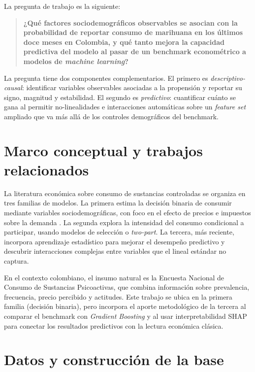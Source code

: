 \documentclass[12pt, a4paper]{article}
\begin{document}
La pregunta de trabajo es la siguiente:

\begin{quote}
\textbf{¿Qué factores sociodemográficos observables se asocian con la probabilidad de reportar consumo de marihuana en los últimos doce meses en Colombia, y qué tanto mejora la capacidad predictiva del modelo al pasar de un benchmark econométrico a modelos de \textit{machine learning}?}
\end{quote}

La pregunta tiene dos componentes complementarios. El primero es \textit{descriptivo-causal}: identificar variables observables asociadas a la propensión y reportar su signo, magnitud y estabilidad. El segundo es \textit{predictivo}: cuantificar cuánto se gana al permitir no-linealidades e interacciones automáticas sobre un \textit{feature set} ampliado que va más allá de los controles demográficos del benchmark.

\section{Marco conceptual y trabajos relacionados}

La literatura económica sobre consumo de sustancias controladas se organiza en tres familias de modelos. La primera estima la decisión binaria de consumir mediante variables sociodemográficas, con foco en el efecto de precios e impuestos sobre la demanda \cite{informal:1}. La segunda explora la intensidad del consumo condicional a participar, usando modelos de selección o \textit{two-part}. La tercera, más reciente, incorpora aprendizaje estadístico para mejorar el desempeño predictivo y descubrir interacciones complejas entre variables que el lineal estándar no captura.

En el contexto colombiano, el insumo natural es la Encuesta Nacional de Consumo de Sustancias Psicoactivas, que combina información sobre prevalencia, frecuencia, precio percibido y actitudes. Este trabajo se ubica en la primera familia (decisión binaria), pero incorpora el aporte metodológico de la tercera al comparar el benchmark con \textit{Gradient Boosting} y al usar interpretabilidad SHAP para conectar los resultados predictivos con la lectura económica clásica.

\section{Datos y construcción de la base}
\end{document}
